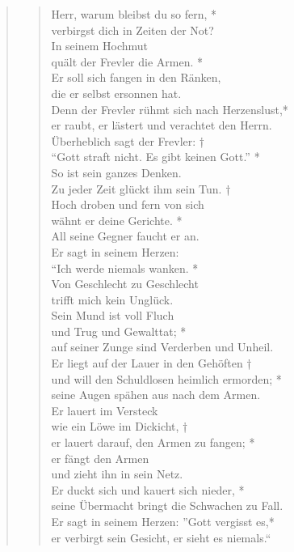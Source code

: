 \begin{quote}
\begin{verse}
Herr, warum bleibst du so fern, *\\
verbirgst dich in Zeiten der Not?\\
\vin In seinem Hochmut\\ 
\vin quält der Frevler die Armen. *\\
\vin Er soll sich fangen in den Ränken,\\ 
\vin die er selbst ersonnen hat.\\
Denn der Frevler rühmt sich nach Herzenslust,*\\
er raubt, er lästert und verachtet den Herrn.\\
\vin Überheblich sagt der Frevler: †\\
\vin ``Gott straft nicht. Es gibt keinen Gott.'' *\\
\vin So ist sein ganzes Denken.\\
Zu jeder Zeit glückt ihm sein Tun. †\\
Hoch droben und fern von sich\\
wähnt er deine Gerichte. *\\
\vin All seine Gegner faucht er an. \\
\vin Er sagt in seinem Herzen:\\ 
\vin ``Ich werde niemals wanken. *\\
Von Geschlecht zu Geschlecht\\
trifft mich kein Unglück.\\
\vin Sein Mund ist voll Fluch \\ 
\vin und Trug und Gewalttat; *\\
\vin auf seiner Zunge sind Verderben und Unheil.\\
Er liegt auf der Lauer in den Gehöften †\\
und will den Schuldlosen heimlich ermorden; *\\
seine Augen spähen aus nach dem Armen.\\
\vin Er lauert im Versteck\\ 
\vin wie ein Löwe im Dickicht, †\\
\vin er lauert darauf, den Armen zu fangen; *\\
\vin er fängt den Armen\\ 
\vin und zieht ihn in sein Netz.\\
Er duckt sich und kauert sich nieder, *\\
seine Übermacht bringt die Schwachen zu Fall.\\
\vin Er sagt in seinem Herzen: ''Gott vergisst es,*\\
\vin er verbirgt sein Gesicht, er sieht es niemals.``\\



\end{verse}
\end{quote}
